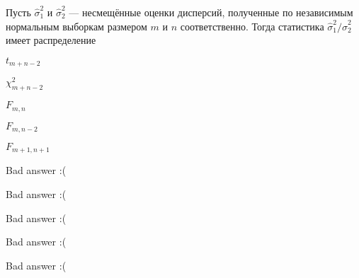 
\begin{question}
Пусть \(\hat\sigma^2_1\) и \(\hat\sigma^2_2\) — несмещённые оценки
дисперсий, полученные по независимым нормальным выборкам размером \(m\)
и \(n\) соответственно. Тогда статистика
\(\hat\sigma^2_1/\hat\sigma^2_2\) имеет распределение
\begin{answerlist}
  \item \(t_{m+n-2}\)
  \item \(\chi^2_{m+n-2}\)
  \item \(F_{m,n}\)
  \item \(F_{m,n-2}\)
  \item \(F_{m+1, n+1}\)
\end{answerlist}
\end{question}

\begin{solution}
\begin{answerlist}
  \item Bad answer :(
  \item Bad answer :(
  \item Bad answer :(
  \item Bad answer :(
  \item Bad answer :(
\end{answerlist}
\end{solution}

